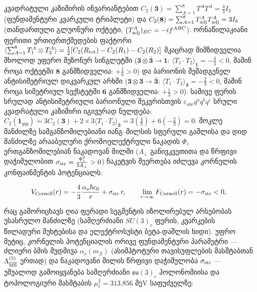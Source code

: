 \documentclass[11pt,a4paper]{article}
\begin{document}
კვადრატული კაზიმირის ინვარიანტებით $C_2(\mathbf{3}) = \sum_{A=1}^8 T^A T^A = \frac{4}{3}I_3$ (ფუნდამენტური კვარკული ტრიპლეტი) და $C_2(\mathbf{8}) = \sum_{A=1}^8 T_{\rm adj}^A T_{\rm adj}^A = 3 I_8$ (თანდართული გლუონური ოქტეტი, $(T_{\rm adj}^A)_{BC} = -i f^{ABC}$). ორნაწილაკიანი ფერითი ურთიერთქმედების ფაქტორი $\langle \sum_{A=1}^8 T_1^A \otimes T_2^A \rangle = \frac{1}{2}[C_2(R_{\rm tot}) - C_2(R_1) - C_2(R_2)]$ მკაცრად მიმზიდველია მხოლოდ უფერო მეზონურ სინგლეტში ($\mathbf{3}\otimes\bar{\mathbf{3}} \to \mathbf{1}$: $\langle T_1\cdot T_2\rangle_{\mathbf{1}} = -\frac{4}{3} < 0$, მაშინ როცა ოქტეტში $\mathbf{8}$ განმზიდველია: $+\frac{1}{6} > 0$) და ბარიონის შემადგენელ ანტისიმეტრიულ დიკვარკულ არხში ($\mathbf{3}\otimes\mathbf{3} \to \bar{\mathbf{3}}$: $\langle T_1\cdot T_2\rangle_{\bar{\mathbf{3}}} = -\frac{2}{3} < 0$, მაშინ როცა სიმეტრიულ სექსტეტში $\mathbf{6}$ განმზიდველია: $+\frac{1}{3} > 0$). სამივე ფერის სრულად ანტისიმეტრიული ბარიონული შეკვრისთვის $\varepsilon_{abc}q^a q^b q^c$ სრული კვადრატული კაზიმირი იგივურად ნულდება: $C_2(\mathbf{1}_{qqq}) = 3 C_2(\mathbf{3}) + 2\times 3\langle T_1\cdot T_2\rangle_{\bar{\mathbf{3}}} = 3\left(\frac{4}{3}\right) + 6\left(-\frac{2}{3}\right) = 0$. მოკლე მანძილზე სამგანზომილებიანი იანგ–მილსის სფერული გაშლისა და დიდ მანძილზე არააბელური ქრომოელექტრული ნაკადის $\Phi_c$ ერთგანზომილებიან ნაკადოვან მილში ($A_\perp$ განივკვეთითა და წრფივი დაჭიმულობით $\sigma_{\rm str} = \frac{\Phi_c^2}{2 A_\perp} > 0$) ჩაკეტვის შეერთება იძლევა კორნელის კონფაინმენტის პოტენციალს:

\[
V_{\rm Cornell}(r) = -\frac{4}{3}\frac{\alpha_s \hbar c_0}{r} + \sigma_{\rm str}\,r, \qquad \lim_{r\to\infty} F_{\rm Cornell}(r) = -\sigma_{\rm str} < 0,
\]

რაც გამორიცხავს ღია ფერადი სეგმენტის იზოლირებულ არსებობას უსასრულო მანძილზე (სამღერძიანი $SU(3)_c$ ფერის, კვარკების წილადური მუხტებისა და ელექტროსუსტი ბეტა-დაშლის ხიდი). უფრო მეტიც, კორნელის პოტენციალის ორივე ფუნდამენტური პარამეტრი — ძლიერი ბმის მუდმივა $\alpha_s(m_Z)$ (ასიმპტოტური თავისუფლების მასშტაბთან $\Lambda_{\overline{\rm MS}}^{(5)}$ ერთად) და ნაკადოვანი მილის წრფივი დაჭიმულობა $\sigma_{\rm str}$ — უშუალოდ გამოიყვანება სამღერძიანი $\mathfrak{su}(3)_c$ ჰოლონომიისა და ტოპოლოგიური მასშტაბის $\mu_\ell^2 = 313.856\text{ მეV}$ საფუძველზე:
\end{document}
